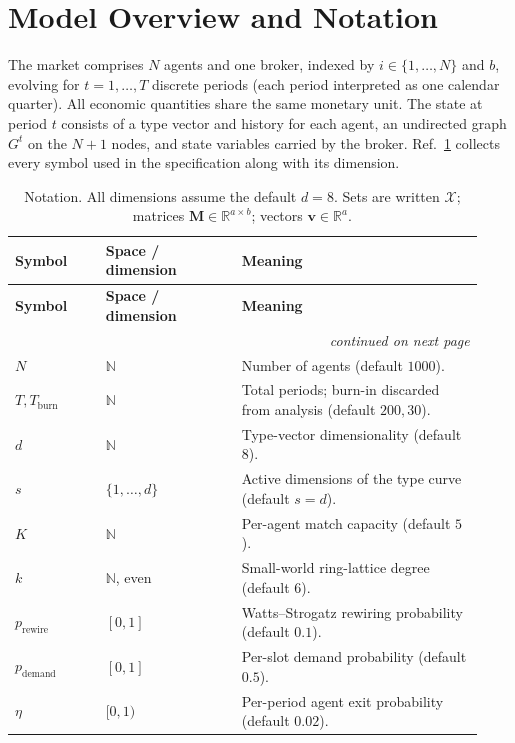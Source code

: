 \documentclass[11pt]{article}
\providecommand{\Cref}[1]{Ref.~\ref{#1}}
\newcommand{\R}{\mathbb{R}}
\newcommand{\Ntot}{N}
\begin{document}
\section{Model Overview and Notation}

The market comprises $\Ntot$ agents and one broker, indexed by $i \in \{1,\ldots,\Ntot\}$ and $b$, evolving for $t = 1,\ldots,T$ discrete periods (each period interpreted as one calendar quarter). All economic quantities share the same monetary unit. The state at period $t$ consists of a type vector and history for each agent, an undirected graph $G^t$ on the $\Ntot + 1$ nodes, and state variables carried by the broker. \Cref{tab:notation} collects every symbol used in the specification along with its dimension.

{\small
\begin{longtable}{@{}p{0.18\linewidth}p{0.27\linewidth}p{0.48\linewidth}@{}}
\caption{Notation. All dimensions assume the default $d=8$. Sets are written
 $\mathcal{X}$; matrices $\mathbf{M} \in \R^{a\times b}$; vectors
 $\mathbf{v}\in\R^{a}$.}\label{tab:notation}\\
\toprule
\textbf{Symbol} & \textbf{Space / dimension} & \textbf{Meaning}\\
\midrule
\endfirsthead
\toprule
\textbf{Symbol} & \textbf{Space / dimension} & \textbf{Meaning}\\
\midrule
\endhead
\multicolumn{3}{r}{\emph{continued on next page}}\\
\endfoot
\bottomrule
\endlastfoot
$\Ntot$ & $\mathbb{N}$ & Number of agents (default $1000$).\\
$T, T_{\text{burn}}$ & $\mathbb{N}$ & Total periods; burn-in discarded from analysis (default $200, 30$).\\
$d$ & $\mathbb{N}$ & Type-vector dimensionality (default $8$).\\
$s$ & $\{1,\ldots,d\}$ & Active dimensions of the type curve (default $s=d$).\\
$K$ & $\mathbb{N}$ & Per-agent match capacity (default $5$).\\
$k$ & $\mathbb{N}$, even & Small-world ring-lattice degree (default $6$).\\
$p_{\text{rewire}}$ & $[0,1]$ & Watts--Strogatz rewiring probability (default $0.1$).\\
$p_{\text{demand}}$ & $[0,1]$ & Per-slot demand probability (default $0.5$).\\
$\eta$ & $[0,1)$ & Per-period agent exit probability (default $0.02$).\\

\end{longtable}}
\end{document}
